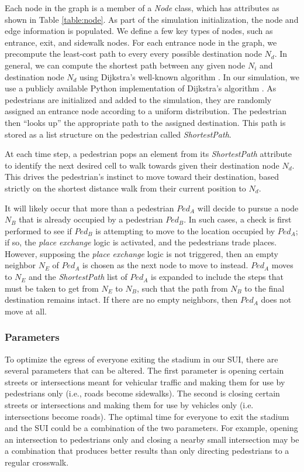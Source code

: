 \documentclass[12pt]{article}
\begin{document}
Each node in the graph is a member of a \textit{Node} class, which
has attributes as shown in Table \ref{table:node}. As part of the simulation
initialization, the node and edge information is
populated. We define a few key types of nodes, such as entrance, exit, and
sidewalk nodes. For each entrance node in the graph, we precompute the
least-cost path to every every possible destination node $N_d$. In general,
we can compute the shortest path between any given node $N_i$ and destination
node $N_d$ using Dijkstra's well-known algorithm \cite{dijkstra1959note}. In our
simulation, we use a publicly available Python implementation of Dijkstra's
algorithm \cite{eppstein-dijkstra}. As pedestrians are initialized and added to
the simulation, they are randomly assigned an entrance node according to a
uniform distribution. The pedestrian then ``looks up'' the appropriate path
to the assigned destination. This path is stored as a list structure on the
pedestrian called \textit{ShortestPath}.

At each time step, a pedestrian pops an element from its \textit{ShortestPath}
attribute to identify the next desired cell to walk towards given
their destination node $N_d$. This drives the pedestrian's instinct to move
toward their destination, based strictly on the shortest distance walk from
their current position to $N_d$.

It will likely occur that more than a pedestrian $Ped_A$ will decide to pursue
a node $N_B$ that is already occupied by a pedestrian $Ped_B$. In such cases, a
check is first performed to see if $Ped_B$ is attempting to move to the location
occupied by $Ped_A$; if so, the \textit{place exchange} logic \cite{blue2001cellular}
is activated, and the pedestrians trade places. However, supposing the
\textit{place exchange} logic is not triggered, then an empty neighbor $N_E$ of
$Ped_A$ is chosen as the next node to move to instead. $Ped_A$ moves to $N_E$ and
the \textit{ShortestPath} list of $Ped_A$ is expanded to include the steps
that must be taken to get from $N_E$ to $N_B$, such that the path from $N_B$ to
the final destination remains intact.  If there are no empty neighbors, then
$Ped_A$ does not move at all.

\subsubsection{Parameters}

To optimize the egress of everyone exiting the stadium in our SUI, there are
several parameters that can be altered. The first parameter is opening certain
streets or intersections meant for vehicular traffic and making them for use by
pedestrians only (i.e., roads become sidewalks). The second is closing certain streets or intersections and making them for use by vehicles only (i.e. intersections become roads). The optimal time for everyone
to exit the stadium and the SUI could be a combination of the
two parameters. For example, opening an intersection to pedestrians only and closing a nearby small intersection may be a combination that produces better
results than only directing pedestrians to a regular crosswalk.
\end{document}
